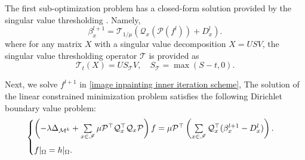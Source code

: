 \documentclass[letterpaper,10pt]{article}
\begin{document}
The first sub-optimization problem has a closed-form solution provided by the singular value thresholding \cite{cai2010singular}.  Namely,
\begin{equation}\label{SVT for inpainting}
\beta_x^{l+1} = \mathcal{T}_{1/\mu} (\mathcal{Q}_x (\mathcal{P} (f^{l})) +D_x^{l}).
\end{equation}
where for any matrix $X$ with a  singular value decomposition $X = USV$, the singular value thresholding operator $\mathcal{T}$ is provided as
\begin{equation}\label{Singular value threshold}
 \mathcal{T}_{t} (X)=US_{\mathcal{T}}V, \quad S_{\mathcal{T}} = \max(S - t,0).
\end{equation}




Next, we solve $f^{l+1}$ in \eqref{image inpainting inner iteration scheme}, The solution of the linear constrained minimization problem satisfies the following Dirichlet boundary value problem:
\begin{equation}\label{non constraint linear system solving}
\begin{cases}
 \left (- \lambda \Delta_{\mathcal{M}^k} +  \sum\limits_{x \in \mathscr{I}} \mu \mathcal{P}^{\top}\mathcal{Q}_x^{\top}\mathcal{Q}_x \mathcal{P}\right)f  = \mu \mathcal{P}^{\top} \left (  \sum\limits_{x \in \mathscr{I}}  \mathcal{Q}_x^{\top}( {\beta}_x^{l+1} -D_x^{l}) \right ). \vspace{0.2cm}\\
f|_\Omega = h|_\Omega.
\end{cases}
\end{equation}
\end{document}
